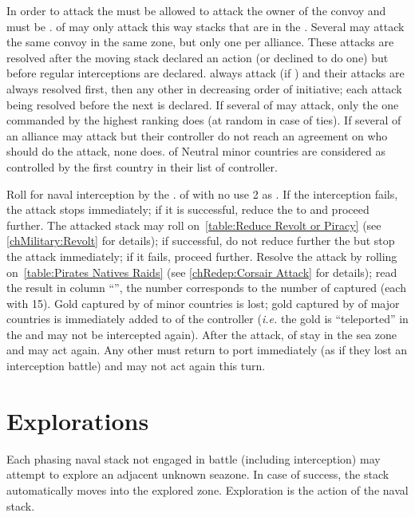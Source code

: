 In order to attack the \corsaire must be allowed to attack the owner of the
convoy and must be \Faceplus. \corsaire of \Barbaresques may only attack this
way stacks that are in the . Several \corsaire may attack
the same convoy in the same zone, but only one per alliance. These attacks are
resolved after the moving stack declared an action (or declined to do one) but
before regular interceptions are declared.  \corsaire always
attack (if \Faceplus) and their attacks are always resolved first, then any
other in decreasing order of initiative; each attack being resolved before the
next is declared. If several \corsaire of  may attack, only the
one commanded by the highest ranking \LeaderA does (at random in case of
ties). If several \corsaire of an alliance may attack but their controller do
not reach an agreement on who should do the attack, none does. \corsaire of
Neutral minor countries are considered as controlled by the first country in
their list of controller.

\bparag Roll for naval interception by the \corsaire. \corsaire of
 with no \LeaderA use 2 as \Man.
\bparag If the interception fails, the attack stops immediately; if it is
successful, reduce the \corsaire to \Facemoins and proceed further.
\bparag The attacked stack may roll on~\ref{table:Reduce Revolt or Piracy}
(see \ref{chMilitary:Revolt} for details); if successful, do not reduce
further the \corsaire but stop the attack immediately; if it fails, proceed
further.
\bparag Resolve the attack by rolling on~\ref{table:Pirates Natives Raids}
(see \ref{chRedep:Corsair Attack} for details); read the result in column
``\TradeFLEET\faceplus'', the number corresponds to the number of \NTD
captured (each with 15\ducats).
\bparag Gold captured by \corsaire of minor countries is lost; gold captured by
\corsaire of major countries is immediately added to
 of the controller (\emph{i.e.} the gold
is ``teleported'' in the \RT and may not be intercepted again).
\bparag After the attack, \corsaire of  stay in the sea zone and
may act again. Any other \corsaire must return to port immediately (as if they
lost an interception battle) and may not act again this turn.

\section{Explorations}\label{chMilitary:Discoveries}
\label{chMilitary:Exploration}
Each phasing naval stack not engaged in battle (including interception) may
attempt to explore an adjacent unknown seazone. In case of success, the stack
automatically moves into the explored zone. Exploration is the action of the
naval stack.

